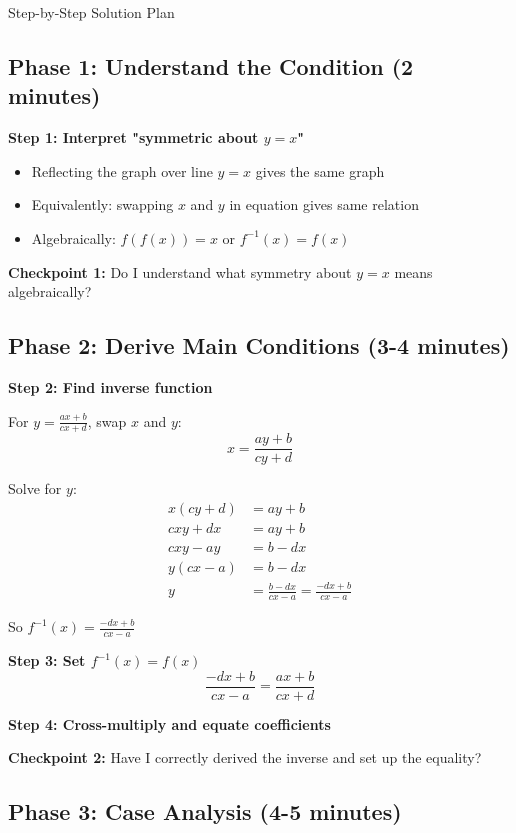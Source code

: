 \documentclass[12pt]{article}
\begin{document}
\begin{roadmapbox}{Step-by-Step Solution Plan}

\subsection*{Phase 1: Understand the Condition (2 minutes)}

\textbf{Step 1: Interpret "symmetric about $y=x$"}
\begin{itemize}
    \item Reflecting the graph over line $y=x$ gives the same graph
    \item Equivalently: swapping $x$ and $y$ in equation gives same relation
    \item Algebraically: $f(f(x)) = x$ or $f^{-1}(x) = f(x)$
\end{itemize}

\textbf{Checkpoint 1:} Do I understand what symmetry about $y=x$ means algebraically?

\subsection*{Phase 2: Derive Main Conditions (3-4 minutes)}

\textbf{Step 2: Find inverse function}

For $y = \frac{ax+b}{cx+d}$, swap $x$ and $y$:
\[x = \frac{ay+b}{cy+d}\]

Solve for $y$:
\begin{align*}
x(cy+d) &= ay+b\\
cxy + dx &= ay + b\\
cxy - ay &= b - dx\\
y(cx-a) &= b-dx\\
y &= \frac{b-dx}{cx-a} = \frac{-dx+b}{cx-a}
\end{align*}

So $f^{-1}(x) = \frac{-dx+b}{cx-a}$

\textbf{Step 3: Set $f^{-1}(x) = f(x)$}
\[\frac{-dx+b}{cx-a} = \frac{ax+b}{cx+d}\]

\textbf{Step 4: Cross-multiply and equate coefficients}

\textbf{Checkpoint 2:} Have I correctly derived the inverse and set up the equality?

\subsection*{Phase 3: Case Analysis (4-5 minutes)}


\end{roadmapbox}
\end{document}
